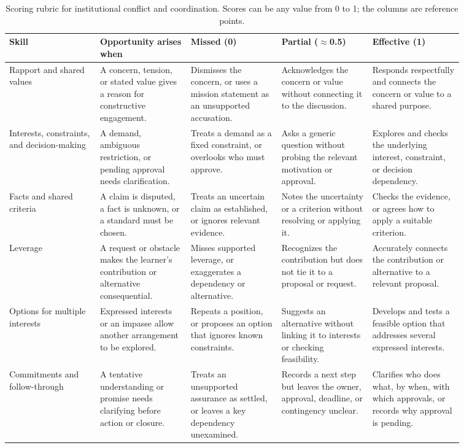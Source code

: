 \documentclass[11pt]{article}
\begin{document}
\begin{table}[t]
\centering
\footnotesize
\renewcommand{\arraystretch}{1.0}
\begin{tabular}{*{5}{>{\raggedright\arraybackslash}p{0.172\linewidth}}}
\hline
\textbf{Skill} & \textbf{Opportunity arises when} & \textbf{Missed (0)} &
\textbf{Partial ($\approx$0.5)} & \textbf{Effective (1)} \\
\hline
Rapport and shared values &
A concern, tension, or stated value gives a reason for constructive engagement. &
Dismisses the concern, or uses a mission statement as an unsupported accusation. &
Acknowledges the concern or value without connecting it to the discussion. &
Responds respectfully and connects the concern or value to a shared purpose. \\
Interests, constraints, and decision-making &
A demand, ambiguous restriction, or pending approval needs clarification. &
Treats a demand as a fixed constraint, or overlooks who must approve. &
Asks a generic question without probing the relevant motivation or approval. &
Explores and checks the underlying interest, constraint, or decision dependency. \\
Facts and shared criteria &
A claim is disputed, a fact is unknown, or a standard must be chosen. &
Treats an uncertain claim as established, or ignores relevant evidence. &
Notes the uncertainty or a criterion without resolving or applying it. &
Checks the evidence, or agrees how to apply a suitable criterion. \\
Leverage &
A request or obstacle makes the learner's contribution or alternative consequential. &
Misses supported leverage, or exaggerates a dependency or alternative. &
Recognizes the contribution but does not tie it to a proposal or request. &
Accurately connects the contribution or alternative to a relevant proposal. \\
Options for multiple interests &
Expressed interests or an impasse allow another arrangement to be explored. &
Repeats a position, or proposes an option that ignores known constraints. &
Suggests an alternative without linking it to interests or checking feasibility. &
Develops and tests a feasible option that addresses several expressed interests. \\
Commitments and follow-through &
A tentative understanding or promise needs clarifying before action or closure. &
Treats an unsupported assurance as settled, or leaves a key dependency unexamined. &
Records a next step but leaves the owner, approval, deadline, or contingency unclear. &
Clarifies who does what, by when, with which approvals, or records why approval is pending. \\
\hline
\end{tabular}
\caption{Scoring rubric for institutional conflict and coordination. Scores can be any
value from 0 to 1; the columns are reference points.}
\label{tab:rubric}
\end{table}
\end{document}
